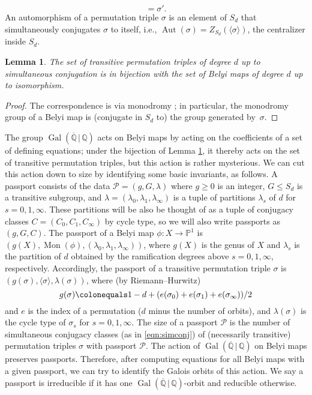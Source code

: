 \documentclass{dcthesis}
\newcommand{\PP}{\mathbb P}
\newcommand{\QQ}{\mathbb Q}
\newcommand{\defi}[1]{\textsf{#1}}
\DeclareMathOperator{\Aut}{Aut}
\DeclareMathOperator{\Mon}{Mon}
\DeclareMathOperator{\Gal}{Gal}
\newtheorem{lemma}[prop]{Lemma}
\theoremstyle{definition}
\theoremstyle{remark}
\numberwithin{equation}{section}
\numberwithin{figure}{section}
\begin{document}
{{{\begin{equation}
        = \sigma'.
      \end{equation}
      An automorphism of a permutation triple $\sigma$ is an element of $S_d$ that
      simultaneously conjugates $\sigma$ to itself, i.e.,
      $\Aut(\sigma)=Z_{S_d}(\langle \sigma \rangle)$, the centralizer inside $S_d$.
      \begin{lemma} \label{lem:simulisom}
        The set of transitive permutation triples of degree $d$ up to simultaneous
        conjugation is in bijection with the set of Belyi maps of degree $d$ up to
        isomorphism.
      \end{lemma}
      \begin{proof}
        The correspondence is via monodromy \cite[Lemma 1.1]{KMSV}; in particular,
        the monodromy group of a Belyi map is (conjugate in $S_d$ to) the group
        generated by~$\sigma$.
      \end{proof}
      The group $\Gal(\overline{\QQ}\,|\,\QQ)$ acts on Belyi maps by acting on the
      coefficients of a set of defining equations; under the bijection of Lemma
      \ref{lem:simulisom}, it thereby acts on the set of transitive permutation
      triples, but this action is rather mysterious.
      We can cut this action down to size by identifying some basic invariants, as
      follows.  A \defi{passport} consists of the data $\mathcal{P}=(g,G,\lambda)$
      where $g \geq 0$ is an integer, $G \leq S_d$ is a transitive subgroup, and
      $\lambda=(\lambda_0,\lambda_1,\lambda_\infty)$ is a tuple of partitions
      $\lambda_s$ of $d$ for $s=0,1,\infty$.  These partitions will be also be
      thought of as a tuple of conjugacy classes $C=(C_0,C_1,C_\infty)$ by cycle
      type, so we will also write passports as $(g,G,C)$.
      The \defi{passport} of a
      Belyi map $\phi\colon X \to \PP^1$ is $(g(X),\Mon(\phi),
      (\lambda_0,\lambda_1,\lambda_\infty))$,
      where $g(X)$ is the genus of $X$ and
      $\lambda_s$ is the partition of $d$ obtained by the ramification degrees above
      $s=0,1,\infty$, respectively.
      Accordingly, the \defi{passport} of a transitive
      permutation triple $\sigma$ is
      $(g(\sigma),\langle \sigma \rangle, \lambda(\sigma))$,
      where (by Riemann--Hurwitz)
      \begin{equation}\label{eqn:riemannhurwitzfortriples}
        g(\sigma) \colonequals 1-d+(e(\sigma_0)+e(\sigma_1)+e(\sigma_\infty))/2
      \end{equation}
      and $e$ is the index of a permutation ($d$ minus the number of orbits), and
      $\lambda(\sigma)$ is the cycle type of $\sigma_s$ for $s=0,1,\infty$. The
      \defi{size} of a passport $\mathcal{P}$ is the number of simultaneous conjugacy
      classes (as in \ref{eqn:simconj}) of (necessarily transitive) permutation
      triples $\sigma$ with passport $\mathcal{P}$.
      The action of $\Gal(\overline{\QQ}\,|\,\QQ)$ on Belyi maps preserves passports.
      Therefore, after computing equations for all Belyi maps with a given
      passport, we can try to identify the Galois orbits of this action.
      We say a passport is \defi{irreducible} if it has one
      $\Gal(\overline{\QQ}\,|\,\QQ)$-orbit and
      \defi{reducible} otherwise.
    }
  }
}
\end{document}
